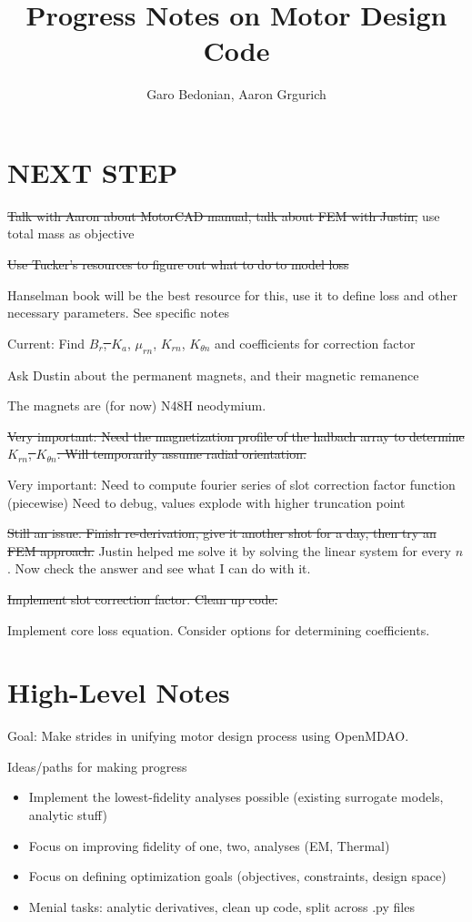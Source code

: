 \documentclass[10pt]{article}
\begin{document}
\title{Progress Notes on Motor Design Code}
\author{Garo Bedonian, Aaron Grgurich}

\maketitle

\section{NEXT STEP}

\sout{Talk with Aaron about MotorCAD manual, talk about FEM with Justin,} use total mass as objective

\sout{Use Tucker's resources to figure out what to do to model loss}

Hanselman book will be the best resource for this, use it to define loss and other necessary parameters. See specific notes

Current: Find \sout{$B_r$, $K_a$}, $\mu_{rn}$, $K_{rn}$, $K_{\theta{}n}$ and coefficients for correction factor

Ask Dustin about the permanent magnets, and their magnetic remanence

The magnets are (for now) N48H neodymium.

\sout{Very important: Need the magnetization profile of the halbach array to determine  $K_{rn}$, $K_{\theta{}n}$. Will temporarily assume radial orientation.}

Very important: Need to compute fourier series of slot correction factor function (piecewise)
Need to debug, values explode with higher truncation point

\sout{Still an issue. Finish re-derivation, give it another shot for a day, then try an FEM approach.}
Justin helped me solve it by solving the linear system for every $n$. Now check the answer and see what I can do with it.

\sout{Implement slot correction factor. Clean up code.}

Implement core loss equation. Consider options for determining coefficients.

\section{High-Level Notes}

Goal: Make strides in unifying motor design process using OpenMDAO.

Ideas/paths for making progress 
\begin{itemize}
	\item Implement the lowest-fidelity analyses possible (existing surrogate models, analytic stuff)
	\item Focus on improving fidelity of one, two, analyses (EM, Thermal)
	\item Focus on defining optimization goals (objectives, constraints, design space)
  \item Menial tasks: analytic derivatives, clean up code, split across .py files
\end{itemize}
\end{document}
